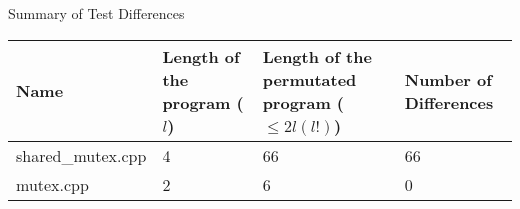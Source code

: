 \documentclass{standalone}
\begin{document}
\begin{center}
\caption{Summary of Test Differences}
\begin{tabularx}{\textwidth}{|X|X|X|X|}
\hline\hline
             Name &  Length of the program ($l$) &  Length of the permutated program ($\leq2l(l!)$) &  Number of Differences \\
\hline
shared\_mutex.cpp &                            4 &                                               66 &                     66 \\
        mutex.cpp &                            2 &                                                6 &                      0 \\
\hline\hline
\end{tabularx}
\end{center}
\end{document}
